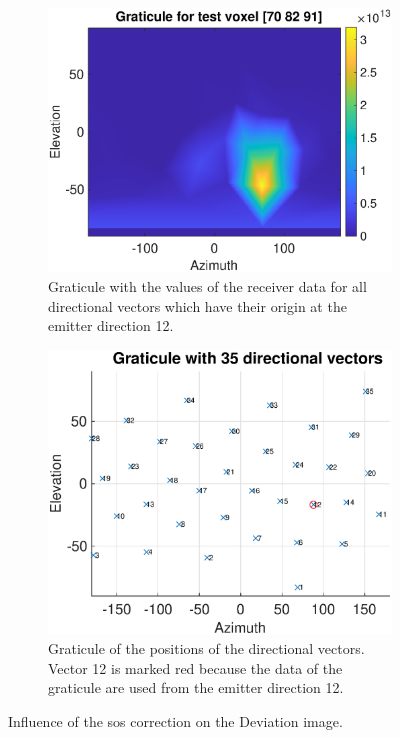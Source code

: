 \begin{figure}[H]
     \centering
     \begin{subfigure}[b]{0.77\textwidth}
                  \centering
         \includegraphics[width=1.09\textwidth]{Graphics/Results/gradnetz/graticule_with_values.eps}
         \caption{Graticule with the values of the receiver data for all directional vectors which have their origin at the emitter direction 12.}
         \label{fig:gadnetz_with_value_values}
     \end{subfigure}
     \hfill
     \begin{subfigure}[b]{0.77\textwidth}
         \centering
         \includegraphics[width=1.09\linewidth]{Graphics/Results/gradnetz/graticule_35_vectors_emitter_12_active.eps}
         \caption{Graticule of the positions of the directional vectors. Vector 12 is marked red because the data of the graticule are used from the emitter direction 12.  }
         \label{fig:gadnetz_with_value_vecotrs}
     \end{subfigure}
        \caption{Influence of the \ac{sos} correction on the Deviation image.}
        \label{fig:gadnetz_with_values}
\end{figure}


